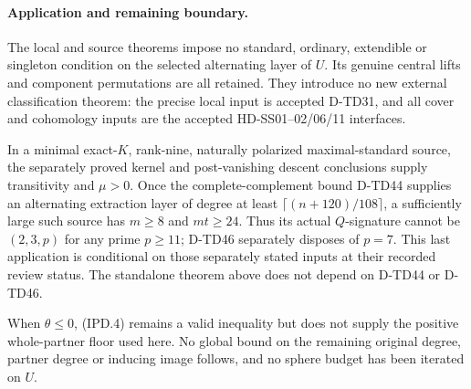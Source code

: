 \paragraph{Application and remaining boundary.}
The local and source theorems impose no standard, ordinary,
extendible or singleton condition on the selected alternating
layer of \(U\). Its genuine central lifts and component
permutations are all retained. They introduce no new external
classification theorem: the precise local input is accepted
D-TD31, and all cover and cohomology inputs are the accepted
HD-SS01--02/06/11 interfaces.

In a minimal exact-\(K\), rank-nine, naturally polarized
maximal-standard source, the separately proved kernel and
post-vanishing descent conclusions supply transitivity and
\(\mu>0\). Once the complete-complement bound D-TD44 supplies
an alternating extraction layer of degree at least
\(\lceil(n+120)/108\rceil\), a sufficiently large such source
has \(m\ge8\) and \(mt\ge24\). Thus its actual
\(Q\)-signature cannot be \((2,3,p)\) for any prime
\(p\ge11\); D-TD46 separately disposes of \(p=7\).
This last application is conditional on those separately stated
inputs at their recorded review status. The standalone theorem
above does not depend on D-TD44 or D-TD46.

When \(\theta\le0\), (IPD.4) remains a valid inequality but
does not supply the positive whole-partner floor used here.
No global bound on the remaining original degree, partner
degree or inducing image follows, and no sphere budget has
been iterated on \(U\).
